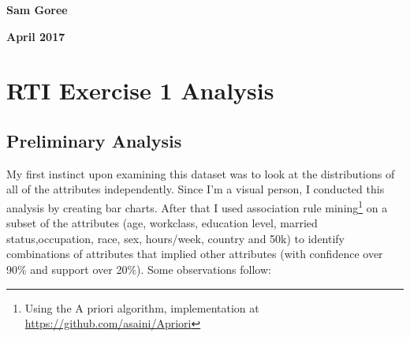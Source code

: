 \documentclass[twoside,12pt]{article}
\begin{document}
\noindent \textbf{Sam Goree}

\noindent \textbf{April 2017}

\section*{RTI Exercise 1 Analysis}

\subsection*{Preliminary Analysis}

My first instinct upon examining this dataset was to look at the distributions of all of the attributes independently. Since I'm a visual person, I conducted this analysis by creating bar charts. After that I used association rule mining\footnote{Using the A priori algorithm, implementation at \url{https://github.com/asaini/Apriori}} on a subset of the attributes (age, workclass, education level, married status,occupation, race, sex, hours/week, country and 50k) to identify combinations of attributes that implied other attributes (with confidence over 90\% and support over 20\%). Some observations follow:
\end{document}

